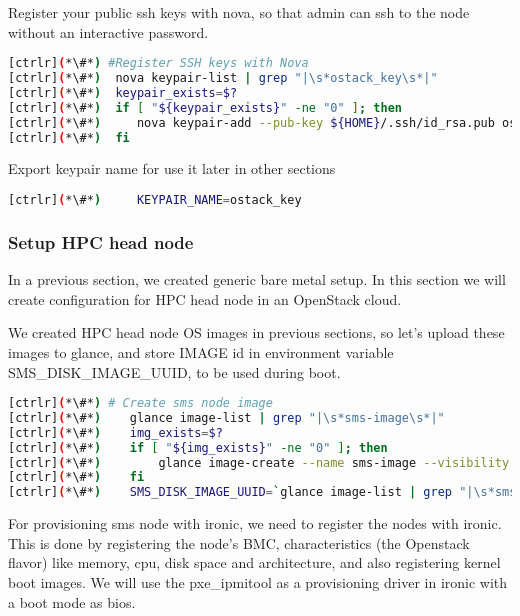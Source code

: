 	Register your public ssh keys with nova, so that admin can ssh to the node without an interactive password.


\begin{lstlisting}[language=bash,keywords={}]
[ctrlr](*\#*) #Register SSH keys with Nova
[ctrlr](*\#*)  nova keypair-list | grep "|\s*ostack_key\s*|"
[ctrlr](*\#*)  keypair_exists=$?
[ctrlr](*\#*)  if [ "${keypair_exists}" -ne "0" ]; then
[ctrlr](*\#*)     nova keypair-add --pub-key ${HOME}/.ssh/id_rsa.pub ostack_key
[ctrlr](*\#*)  fi
\end{lstlisting} 

	Export keypair name for use it later in other sections


\begin{lstlisting}[language=bash,keywords={}]
[ctrlr](*\#*)     KEYPAIR_NAME=ostack_key
\end{lstlisting} 

\subsubsection{Setup HPC head node}


	In a previous section, we created generic bare metal setup. In this section we will create configuration for HPC head node in an OpenStack cloud.
	
	We created HPC head node OS images in previous sections, so let's upload these images to glance, and store IMAGE id in environment variable SMS\_DISK\_IMAGE\_UUID, to be used during boot. 

\begin{lstlisting}[language=bash,keywords={}]
[ctrlr](*\#*) # Create sms node image
[ctrlr](*\#*)    glance image-list | grep "|\s*sms-image\s*|"
[ctrlr](*\#*)    img_exists=$?
[ctrlr](*\#*)    if [ "${img_exists}" -ne "0" ]; then
[ctrlr](*\#*)        glance image-create --name sms-image --visibility public --disk-format qcow2 --container-format bare < ${chpc_image_sms}
[ctrlr](*\#*)    fi
[ctrlr](*\#*)    SMS_DISK_IMAGE_UUID=`glance image-list | grep "|\s*sms-image\s*|" | awk '{print $2}'`
\end{lstlisting} 

	For provisioning sms node with ironic, we need to register the nodes with ironic. This is done by registering the node's BMC, characteristics (the Openstack flavor) like memory, cpu, disk space and architecture, and also registering kernel boot images. We will use the pxe\_ipmitool as a provisioning driver in ironic with a boot mode as bios.

